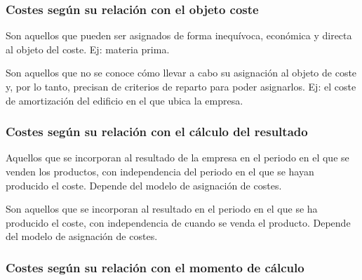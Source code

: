 \documentclass[12pt]{report} %
\begin{document}
\hypertarget{costes-seguxfan-su-relaciuxf3n-con-el-objeto-coste}{%
\subsubsection{Costes según su relación con el objeto
coste}\label{costes-seguxfan-su-relaciuxf3n-con-el-objeto-coste}}

\begin{definicion}
Son aquellos que pueden ser asignados de forma inequívoca, económica y directa al objeto del coste. Ej: materia prima.
\end{definicion}

\begin{definicion}
Son aquellos que no se conoce cómo llevar a cabo su asignación al objeto de coste y, por lo tanto, precisan de criterios de reparto para poder asignarlos. Ej: el coste de amortización del edificio en el que ubica la empresa.
\end{definicion}

\hypertarget{costes-seguxfan-su-relaciuxf3n-con-el-cuxe1lculo-del-resultado}{%
\subsubsection{Costes según su relación con el cálculo del
resultado}\label{costes-seguxfan-su-relaciuxf3n-con-el-cuxe1lculo-del-resultado}}

\begin{definicion}
Aquellos que se incorporan al resultado de la empresa en el periodo en el que se venden los productos, con independencia del periodo en el que se hayan producido el coste. Depende del modelo de asignación de costes.
\end{definicion}

\begin{definicion}
Son aquellos que se incorporan al resultado en el periodo en el que se ha producido el coste, con independencia de cuando se venda el producto. Depende del modelo de asignación de costes.
\end{definicion}

\hypertarget{costes-seguxfan-su-relaciuxf3n-con-el-momento-de-cuxe1lculo}{%
\subsubsection{Costes según su relación con el momento de
cálculo}\label{costes-seguxfan-su-relaciuxf3n-con-el-momento-de-cuxe1lculo}}
\end{document}
